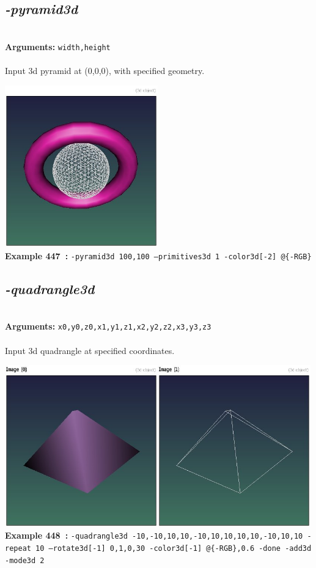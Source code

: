 \documentclass[a4paper,11pt,twoside]{book}
\begin{document}
\subsection{\emph{-pyramid3d} }\vspace*{-0.5em}
~\\\textbf{Arguments: } 
{\small \texttt{width,height}}\\~\\
Input 3d pyramid at (0,0,0), with specified geometry.
\begin{center}\includegraphics[keepaspectratio=true,height=7cm,width=\textwidth]{img/gmic_def447.jpg}\\
{\footnotesize \textbf{Example 447~:} \texttt{-pyramid3d 100,100 --primitives3d 1 -color3d[-2] @\{-RGB\}}}
\end{center}

\subsection{\emph{-quadrangle3d} }\vspace*{-0.5em}
~\\\textbf{Arguments: } 
{\small \texttt{x0,y0,z0,x1,y1,z1,x2,y2,z2,x3,y3,z3}}\\~\\
Input 3d quadrangle at specified coordinates.
\begin{center}\includegraphics[keepaspectratio=true,height=7cm,width=\textwidth]{img/gmic_def448.jpg}\\
{\footnotesize \textbf{Example 448~:} \texttt{-quadrangle3d -10,-10,10,10,-10,10,10,10,10,-10,10,10 -repeat 10 --rotate3d[-1] 0,1,0,30 -color3d[-1] @\{-RGB\},0.6 -done -add3d -mode3d 2}}
\end{center}
\end{document}
